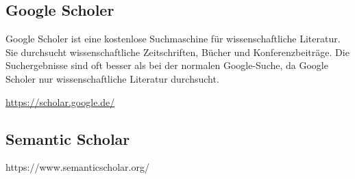 \documentclass[11pt]{article}
\begin{document}
	\subsection{Google Scholer}
	Google Scholer ist eine kostenlose Suchmaschine für wissenschaftliche Literatur. 
	Sie durchsucht wissenschaftliche Zeitschriften, Bücher und Konferenzbeiträge. 
	Die Suchergebnisse sind oft besser als bei der normalen Google-Suche, da Google Scholer nur wissenschaftliche Literatur 
	durchsucht. \cite{halevi2017suitability}

	\href{htts://scholar.google.de/}{https://scholar.google.de/}

	\subsection{Semantic Scholar}
	https://www.semanticscholar.org/

	\pagebreak

	{}
	
\end{document}
